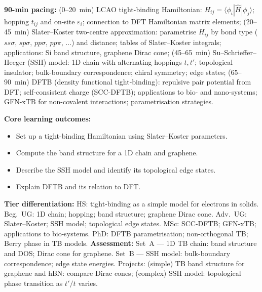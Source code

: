 \documentclass[11pt,a4paper]{article}
\begin{document}
\medskip

\begin{tcolorbox}[chembox, title={Module~III.3 / L06: Tight-Binding and Effective Hamiltonians}]
\textbf{90-min pacing:} (0--20~min) LCAO tight-binding Hamiltonian: $H_{ij}=\langle\phi_i|\hat{H}|\phi_j\rangle$; hopping $t_{ij}$ and on-site $\varepsilon_i$; connection to DFT Hamiltonian matrix elements; (20--45~min) Slater--Koster two-centre approximation: parametrise $H_{ij}$ by bond type ($ss\sigma$, $sp\sigma$, $pp\sigma$, $pp\pi$, $\ldots$) and distance; tables of Slater--Koster integrals; applications: Si band structure, graphene Dirac cone; (45--65~min) Su--Schrieffer--Heeger (SSH) model: 1D chain with alternating hoppings $t,t'$; topological insulator; bulk-boundary correspondence; chiral symmetry; edge states; (65--90~min) DFTB (density functional tight-binding): repulsive pair potential from DFT; self-consistent charge (SCC-DFTB); applications to bio- and nano-systems; GFN-xTB for non-covalent interactions; parametrisation strategies.

\medskip\textbf{Core learning outcomes:}
\begin{itemize}[leftmargin=1.4em,topsep=2pt,itemsep=1pt]
  \item Set up a tight-binding Hamiltonian using Slater--Koster parameters.
  \item Compute the band structure for a 1D chain and graphene.
  \item Describe the SSH model and identify its topological edge states.
  \item Explain DFTB and its relation to DFT.
\end{itemize}
\medskip\textbf{Tier differentiation:}
HS: tight-binding as a simple model for electrons in solids.
Beg.\ UG: 1D chain; hopping; band structure; graphene Dirac cone.
Adv.\ UG: Slater--Koster; SSH model; topological edge states.
MSc: SCC-DFTB; GFN-xTB; applications to bio-systems.
PhD: DFTB parametrisation; non-orthogonal TB; Berry phase in TB models.
\medskip\textbf{Assessment:}
Set~A --- 1D TB chain: band structure and DOS; Dirac cone for graphene.
Set~B --- SSH model: bulk-boundary correspondence; edge state energies.
Projects: (simple) TB band structure for graphene and hBN: compare Dirac cones; (complex) SSH model: topological phase transition as $t'/t$ varies.
\end{tcolorbox}

\medskip
\end{document}
